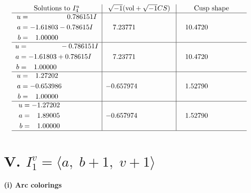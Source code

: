 \documentclass[1p]{elsarticle_modified}
\theoremstyle{definition}
\newcommand{\I}{\sqrt{-1}}
\begin{document}
$$\begin{array}{c|c|c}  
\text{Solutions to }I^u_{4}& \I (\text{vol} + \sqrt{-1}CS) & \text{Cusp shape}\\
 \hline 
\begin{aligned}
u &= \phantom{-0.000000 -}0.786151 I \\
a &= -1.61803 - 0.78615 I \\
b &= \phantom{-}1.00000\phantom{ +0.000000I}\end{aligned}
 & \phantom{-}7.23771\phantom{ +0.000000I} & \phantom{-}10.4720\phantom{ +0.000000I} \\ \hline\begin{aligned}
u &= \phantom{-0.000000 } -0.786151 I \\
a &= -1.61803 + 0.78615 I \\
b &= \phantom{-}1.00000\phantom{ +0.000000I}\end{aligned}
 & \phantom{-}7.23771\phantom{ +0.000000I} & \phantom{-}10.4720\phantom{ +0.000000I} \\ \hline\begin{aligned}
u &= \phantom{-}1.27202\phantom{ +0.000000I} \\
a &= -0.653986\phantom{ +0.000000I} \\
b &= \phantom{-}1.00000\phantom{ +0.000000I}\end{aligned}
 & -0.657974\phantom{ +0.000000I} & \phantom{-}1.52790\phantom{ +0.000000I} \\ \hline\begin{aligned}
u &= -1.27202\phantom{ +0.000000I} \\
a &= \phantom{-}1.89005\phantom{ +0.000000I} \\
b &= \phantom{-}1.00000\phantom{ +0.000000I}\end{aligned}
 & -0.657974\phantom{ +0.000000I} & \phantom{-}1.52790\phantom{ +0.000000I}\\
 \hline 
 \end{array}$$\newpage\newpage\renewcommand{\arraystretch}{1}
\centering \section*{V. $I^v_{1}= \langle a,\;b+1,\;v+1 \rangle$}
\flushleft \textbf{(i) Arc colorings}\\
\end{document}
